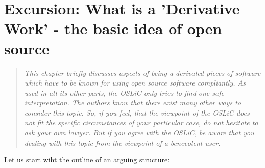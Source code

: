 %
%
%
%
%



\section{Excursion: What is a 'Derivative Work' - the basic idea of open source}
\footnotesize \begin{quote}\itshape This chapter briefly discusses aspects of
being a derivated pieces of software which have to be known for using open
source software compliantly. As used in all its other parts, the OSLiC
only tries to find one safe interpretation. The authors know that there
exist many other ways to consider this topic. So, if you feel, that the
viewpoint of the OSLiC does not fit the specific circumstances of your
particular case, do not hesitate to ask your own lawyer. But if you agree with
the OSLiC, be aware that you dealing with this topic from the viewpoint of a
benevolent user.
\end{quote}
\normalsize
Let us start wiht the outline of an arguing structure:

